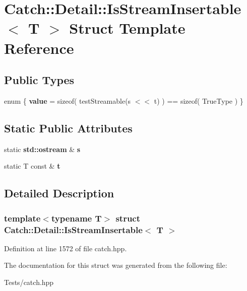 \hypertarget{struct_catch_1_1_detail_1_1_is_stream_insertable}{}\section{Catch\+:\+:Detail\+:\+:Is\+Stream\+Insertable$<$ T $>$ Struct Template Reference}
\label{struct_catch_1_1_detail_1_1_is_stream_insertable}
\subsection*{Public Types}
\begin{DoxyCompactItemize}
\item 
\mbox{\label{struct_catch_1_1_detail_1_1_is_stream_insertable_a2e4508694da3bf368ff67733a7970edd}} 
enum \{ {\bfseries value} = sizeof( test\+Streamable(s $<$$<$ t) ) == sizeof( True\+Type )
 \}
\end{DoxyCompactItemize}
\subsection*{Static Public Attributes}
\begin{DoxyCompactItemize}
\item 
\mbox{\label{struct_catch_1_1_detail_1_1_is_stream_insertable_abe3d3c8e5d85665747faafffc9a96b00}} 
static \textbf{ std\+::ostream} \& {\bfseries s}
\item 
\mbox{\label{struct_catch_1_1_detail_1_1_is_stream_insertable_a7d2a3da978b6736667a7b2f6d51f507f}} 
static T const  \& {\bfseries t}
\end{DoxyCompactItemize}


\subsection{Detailed Description}
\subsubsection*{template$<$typename T$>$\newline
struct Catch\+::\+Detail\+::\+Is\+Stream\+Insertable$<$ T $>$}



Definition at line 1572 of file catch.\+hpp.



The documentation for this struct was generated from the following file\+:\begin{DoxyCompactItemize}
\item 
Tests/catch.\+hpp\end{DoxyCompactItemize}

